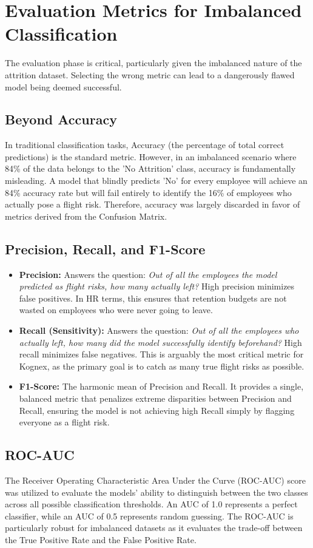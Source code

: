 \section{Evaluation Metrics for Imbalanced Classification}
The evaluation phase is critical, particularly given the imbalanced nature of the attrition dataset. Selecting the wrong metric can lead to a dangerously flawed model being deemed successful.

\subsection{Beyond Accuracy}
In traditional classification tasks, Accuracy (the percentage of total correct predictions) is the standard metric. However, in an imbalanced scenario where 84\% of the data belongs to the 'No Attrition' class, accuracy is fundamentally misleading. A model that blindly predicts 'No' for every employee will achieve an 84\% accuracy rate but will fail entirely to identify the 16\% of employees who actually pose a flight risk. Therefore, accuracy was largely discarded in favor of metrics derived from the Confusion Matrix.

\subsection{Precision, Recall, and F1-Score}
\begin{itemize}
    \item \textbf{Precision:} Answers the question: \textit{Out of all the employees the model predicted as flight risks, how many actually left?} High precision minimizes false positives. In HR terms, this ensures that retention budgets are not wasted on employees who were never going to leave.
    \item \textbf{Recall (Sensitivity):} Answers the question: \textit{Out of all the employees who actually left, how many did the model successfully identify beforehand?} High recall minimizes false negatives. This is arguably the most critical metric for Kognex, as the primary goal is to catch as many true flight risks as possible.
    \item \textbf{F1-Score:} The harmonic mean of Precision and Recall. It provides a single, balanced metric that penalizes extreme disparities between Precision and Recall, ensuring the model is not achieving high Recall simply by flagging everyone as a flight risk.
\end{itemize}

\subsection{ROC-AUC}
The Receiver Operating Characteristic Area Under the Curve (ROC-AUC) score was utilized to evaluate the models' ability to distinguish between the two classes across all possible classification thresholds. An AUC of 1.0 represents a perfect classifier, while an AUC of 0.5 represents random guessing. The ROC-AUC is particularly robust for imbalanced datasets as it evaluates the trade-off between the True Positive Rate and the False Positive Rate.

